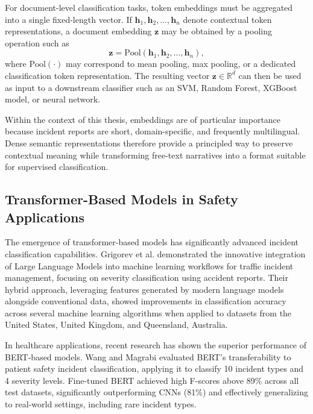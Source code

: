 \documentclass[11pt, titlepage, bibliography=totoc]{scrreprt}
\begin{document}
For document-level classification tasks, token embeddings must be aggregated into a single fixed-length vector. If $\mathbf{h}_1, \mathbf{h}_2, \dots, \mathbf{h}_n$ denote contextual token representations, a document embedding $\mathbf{z}$ may be obtained by a pooling operation such as
\begin{equation}
\mathbf{z} = \mathrm{Pool}(\mathbf{h}_1, \mathbf{h}_2, \dots, \mathbf{h}_n),
\end{equation}
where $\mathrm{Pool}(\cdot)$ may correspond to mean pooling, max pooling, or a dedicated classification token representation. The resulting vector $\mathbf{z} \in \mathbb{R}^{d}$ can then be used as input to a downstream classifier such as an SVM, Random Forest, XGBoost model, or neural network.

Within the context of this thesis, embeddings are of particular importance because incident reports are short, domain-specific, and frequently multilingual. Dense semantic representations therefore provide a principled way to preserve contextual meaning while transforming free-text narratives into a format suitable for supervised classification.

\subsection{Transformer-Based Models in Safety Applications}
The emergence of transformer-based models has significantly advanced incident classification capabilities. Grigorev et al. \cite{grigorev2024} demonstrated the innovative integration of Large Language Models into machine learning workflows for traffic incident management, focusing on severity classification using accident reports. Their hybrid approach, leveraging features generated by modern language models alongside conventional data, showed improvements in classification accuracy across several machine learning algorithms when applied to datasets from the United States, United Kingdom, and Queensland, Australia.

In healthcare applications, recent research has shown the superior performance of BERT-based models. Wang and Magrabi \cite{Ying} evaluated BERT's transferability to patient safety incident classification, applying it to classify 10 incident types and 4 severity levels. Fine-tuned BERT achieved high F-scores above 89\% across all test datasets, significantly outperforming CNNs (81\%) and effectively generalizing to real-world settings, including rare incident types.
\end{document}
